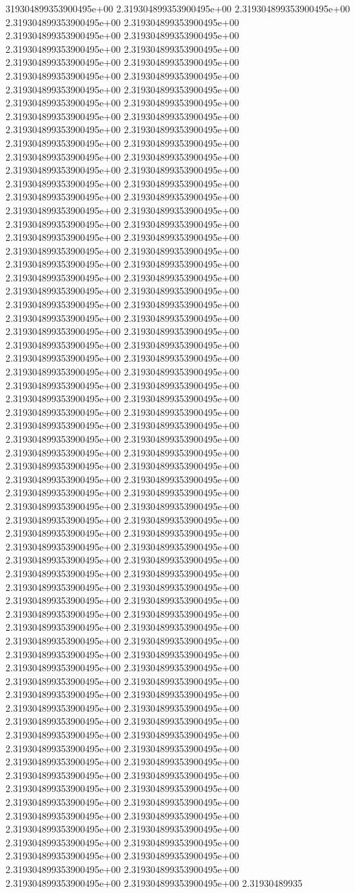 319304899353900495e+00	2.319304899353900495e+00	2.319304899353900495e+00	2.319304899353900495e+00	2.319304899353900495e+00	2.319304899353900495e+00	2.319304899353900495e+00	2.319304899353900495e+00	2.319304899353900495e+00	2.319304899353900495e+00	2.319304899353900495e+00	2.319304899353900495e+00	2.319304899353900495e+00	2.319304899353900495e+00	2.319304899353900495e+00	2.319304899353900495e+00	2.319304899353900495e+00	2.319304899353900495e+00	2.319304899353900495e+00	2.319304899353900495e+00	2.319304899353900495e+00	2.319304899353900495e+00	2.319304899353900495e+00	2.319304899353900495e+00	2.319304899353900495e+00	2.319304899353900495e+00	2.319304899353900495e+00	2.319304899353900495e+00	2.319304899353900495e+00	2.319304899353900495e+00	2.319304899353900495e+00	2.319304899353900495e+00	2.319304899353900495e+00	2.319304899353900495e+00	2.319304899353900495e+00	2.319304899353900495e+00	2.319304899353900495e+00	2.319304899353900495e+00	2.319304899353900495e+00	2.319304899353900495e+00	2.319304899353900495e+00	2.319304899353900495e+00	2.319304899353900495e+00	2.319304899353900495e+00	2.319304899353900495e+00	2.319304899353900495e+00	2.319304899353900495e+00	2.319304899353900495e+00	2.319304899353900495e+00	2.319304899353900495e+00	2.319304899353900495e+00	2.319304899353900495e+00	2.319304899353900495e+00	2.319304899353900495e+00	2.319304899353900495e+00	2.319304899353900495e+00	2.319304899353900495e+00	2.319304899353900495e+00	2.319304899353900495e+00	2.319304899353900495e+00	2.319304899353900495e+00	2.319304899353900495e+00	2.319304899353900495e+00	2.319304899353900495e+00	2.319304899353900495e+00	2.319304899353900495e+00	2.319304899353900495e+00	2.319304899353900495e+00	2.319304899353900495e+00	2.319304899353900495e+00	2.319304899353900495e+00	2.319304899353900495e+00	2.319304899353900495e+00	2.319304899353900495e+00	2.319304899353900495e+00	2.319304899353900495e+00	2.319304899353900495e+00	2.319304899353900495e+00	2.319304899353900495e+00	2.319304899353900495e+00	2.319304899353900495e+00	2.319304899353900495e+00	2.319304899353900495e+00	2.319304899353900495e+00	2.319304899353900495e+00	2.319304899353900495e+00	2.319304899353900495e+00	2.319304899353900495e+00	2.319304899353900495e+00	2.319304899353900495e+00	2.319304899353900495e+00	2.319304899353900495e+00	2.319304899353900495e+00	2.319304899353900495e+00	2.319304899353900495e+00	2.319304899353900495e+00	2.319304899353900495e+00	2.319304899353900495e+00	2.319304899353900495e+00	2.319304899353900495e+00	2.319304899353900495e+00	2.319304899353900495e+00	2.319304899353900495e+00	2.319304899353900495e+00	2.319304899353900495e+00	2.319304899353900495e+00	2.319304899353900495e+00	2.319304899353900495e+00	2.319304899353900495e+00	2.319304899353900495e+00	2.319304899353900495e+00	2.319304899353900495e+00	2.319304899353900495e+00	2.319304899353900495e+00	2.319304899353900495e+00	2.319304899353900495e+00	2.319304899353900495e+00	2.319304899353900495e+00	2.319304899353900495e+00	2.319304899353900495e+00	2.319304899353900495e+00	2.319304899353900495e+00	2.319304899353900495e+00	2.319304899353900495e+00	2.319304899353900495e+00	2.319304899353900495e+00	2.319304899353900495e+00	2.319304899353900495e+00	2.319304899353900495e+00	2.319304899353900495e+00	2.319304899353900495e+00	2.319304899353900495e+00	2.319304899353900495e+00	2.31930489935